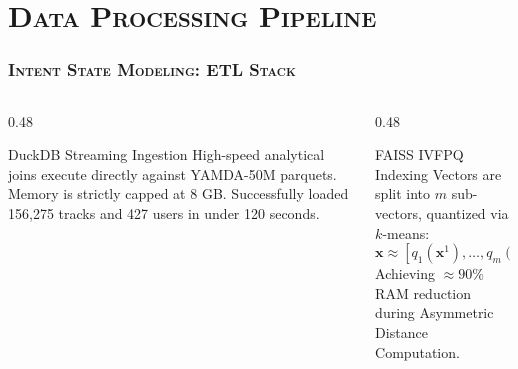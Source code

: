 \documentclass[aspectratio=169,10pt]{beamer}
\begin{document}
\section{\textsc{Data Processing Pipeline}}
\begin{frame}
  \frametitle{\textsc{Intent State Modeling: ETL Stack}}

  \begin{columns}[T]
    \begin{column}{0.48\textwidth}
      \begin{block}{DuckDB Streaming Ingestion}
        \fontsize{7.5pt}{9.5pt}\selectfont
        High-speed analytical joins execute directly against YAMDA-50M parquets. Memory is strictly capped at 8 GB. Successfully loaded 156,275 tracks and 427 users in under 120 seconds.
      \end{block}
    \end{column}
    \begin{column}{0.48\textwidth}
      \begin{exampleblock}{FAISS IVFPQ Indexing}
        \fontsize{7.5pt}{9.5pt}\selectfont
        Vectors are split into $m$ sub-vectors, quantized via $k$-means:
        \begin{equation}
            \mathbf{x} \approx [q_1(\mathbf{x}^1), \dots, q_m(\mathbf{x}^m)]
        \end{equation}
        Achieving $\approx 90\%$ RAM reduction during Asymmetric Distance Computation.
      \end{exampleblock}
    \end{column}
  \end{columns}
\end{frame}

\end{document}
